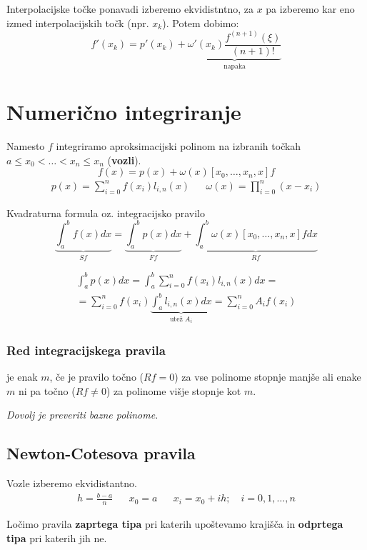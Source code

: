 \begin{multicols}{5}
Interpolacijske točke ponavadi izberemo ekvidistntno, za $x$ pa izberemo kar eno izmed
interpolacijskih točk (npr. $x_k$). Potem dobimo:
\[ 
    f'(x_k) = p'(x_k) + 
    \underbrace{\omega'(x_k) \frac{f^{(n+1)}(\xi)}{(n+1)!}}_{\text{napaka}}
\]

\section*{Numerično integriranje}

Namesto $f$ integriramo aproksimacijski polinom na izbranih točkah $a \leq x_0 < \dots < x_n \leq x_n$ (\textbf{vozli}).
\[
f(x) = p(x) + \omega(x) [x_0, \dots, x_n, x] f
\]
\begin{align*}
    p(x) = \sum_{i=0}^n f(x_i) l_{i,n}(x) && \omega(x) = \prod_{i=0}^n (x-x_i)
\end{align*}

Kvadraturna formula oz. integracijsko pravilo
\[
\underbrace{\int_a^b f(x) dx}_{Sf} =
\underbrace{\int_a^b p(x) dx}_{Ff} +
\underbrace{\int_a^b \omega(x)[x_0, \dots, x_n, x]f dx}_{Rf} 
\]

\begin{multline*}  
    \int_a^b p(x) dx = 
    \int_a^b \sum_{i=0}^n f(x_i) l_{i,n}(x) dx = \\
    = \sum_{i=0}^n f(x_i) \underbrace{\int_a^b l_{i,n}(x) dx}_{\text{utež } A_i} = 
    \sum_{i=0}^n A_i f(x_i)
\end{multline*}

\subsubsection*{Red integracijskega pravila}
je enak $m$, če je pravilo točno ($Rf = 0$) za vse polinome stopnje manjše ali enake $m$ ni pa točno ($Rf \neq 0$) za polinome višje stopnje kot $m$.

\textit{Dovolj je preveriti bazne polinome.}

\subsection*{Newton-Cotesova pravila}
Vozle izberemo ekvidistantno.
\begin{align*}
    h = \frac{b-a}{n} && x_0 = a && x_i = x_0 + ih; \quad i = 0, 1, \dots, n
\end{align*}

Ločimo pravila \textbf{zaprtega tipa} pri katerih upoštevamo krajišča in \textbf{odprtega tipa} pri katerih jih ne.


\end{multicols}
